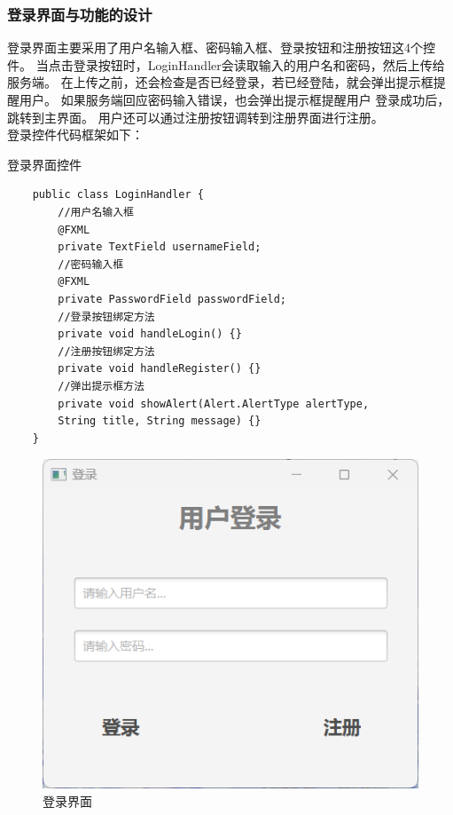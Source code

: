 \documentclass[utf8]{article}
\begin{document}
\subsubsection{登录界面与功能的设计}
登录界面主要采用了用户名输入框、密码输入框、登录按钮和注册按钮这4个控件。
当点击登录按钮时，LoginHandler会读取输入的用户名和密码，然后上传给服务端。
在上传之前，还会检查是否已经登录，若已经登陆，就会弹出提示框提醒用户。
如果服务端回应密码输入错误，也会弹出提示框提醒用户
登录成功后，跳转到主界面。
用户还可以通过注册按钮调转到注册界面进行注册。\\
登录控件代码框架如下：
\begin{listing}[htb]
    \caption{登录界面控件}
    \begin{verbatim}
    public class LoginHandler {
        //用户名输入框
        @FXML
        private TextField usernameField; 
        //密码输入框
        @FXML 
        private PasswordField passwordField;
        //登录按钮绑定方法
        private void handleLogin() {}
        //注册按钮绑定方法
        private void handleRegister() {}
        //弹出提示框方法
        private void showAlert(Alert.AlertType alertType, 
        String title, String message) {}
    }
    \end{verbatim}
\end{listing}
\newpage
\begin{figure}[H]
    \centering
    \includegraphics[width=\textwidth]{pictures/5}
    \caption{登录界面}
\end{figure}
\end{document}
